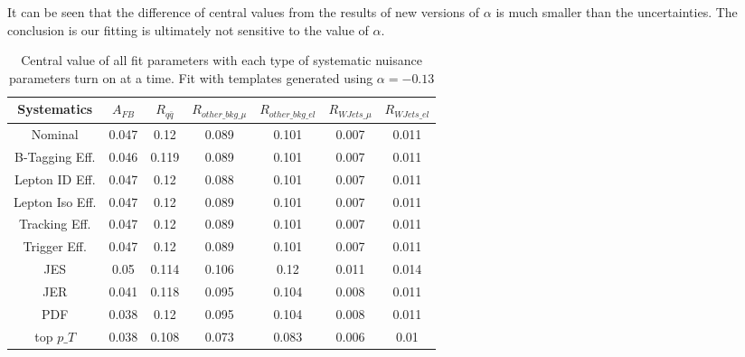 It can be seen that the difference of central values from the results of new versions of $\alpha$ is much smaller than the uncertainties. The conclusion is our fitting is ultimately not sensitive to the value of $\alpha$.

\begin{table}[htb]
\centering
\begin{tabular}{c|cc|cccc}
Systematics &      $A_{FB}$ &   $R_{q\bar{q}}$ & $R_{other\_bkg\_\mu}$ & $R_{other\_bkg\_el}$ & $R_{WJets\_\mu}$ & $R_{WJets\_el}$ \\
\hline
Nominal         &  0.047 &   0.12 &          0.089 &          0.101 &      0.007 &      0.011 \\
\hline
B-Tagging Eff.  &  0.046 &  0.119 &          0.089 &          0.101 &      0.007 &      0.011 \\
Lepton ID Eff.  &  0.047 &   0.12 &          0.088 &          0.101 &      0.007 &      0.011 \\
Lepton Iso Eff. &  0.047 &   0.12 &          0.089 &          0.101 &      0.007 &      0.011 \\
Tracking Eff.   &  0.047 &   0.12 &          0.089 &          0.101 &      0.007 &      0.011 \\
Trigger Eff.    &  0.047 &   0.12 &          0.089 &          0.101 &      0.007 &      0.011 \\
\hline
JES             &   0.05 &  0.114 &          0.106 &           0.12 &      0.011 &      0.014 \\
JER             &  0.041 &  0.118 &          0.095 &          0.104 &      0.008 &      0.011 \\
PDF             &  0.038 &   0.12 &          0.095 &          0.104 &      0.008 &      0.011 \\
\hline
top $p\_T$         &  0.038 &  0.108 &          0.073 &          0.083 &      0.006 &       0.01 \\
\hline
\end{tabular}
\caption{Central value of all fit parameters with each type of systematic nuisance parameters turn on at a time. Fit with templates generated using $\alpha=-0.13$}
\label{tab:sys-full-old-alpha}
\end{table}

